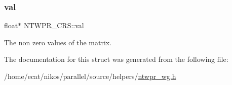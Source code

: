 \subsubsection{\texorpdfstring{val}{val}}
{\footnotesize\ttfamily float$\ast$ N\+T\+W\+P\+R\+\_\+\+C\+R\+S\+::val}

The non zero values of the matrix. 

The documentation for this struct was generated from the following file\+:\begin{DoxyCompactItemize}
\item 
/home/ecat/nikos/parallel/source/helpers/\mbox{\hyperlink{ntwpr__wg_8h}{ntwpr\+\_\+wg.\+h}}\end{DoxyCompactItemize}
